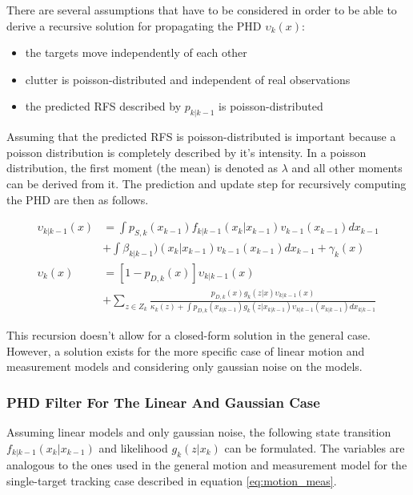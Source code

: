There are several assumptions that have to be considered in order to be able to derive a recursive solution for propagating the PHD $\upsilon_k(x)$:

\begin{itemize}
    \item the targets move independently of each other
    \item clutter is poisson-distributed and independent of real observations
    \item the predicted RFS described by $p_{k|k-1}$ is poisson-distributed
\end{itemize}

Assuming that the predicted RFS is poisson-distributed is important because a poisson distribution is completely described by it's intensity. In a poisson distribution, the first moment (the mean) is denoted as $\lambda$ and all other moments can be derived from it. The prediction and update step for recursively computing the PHD are then as follows.\cite{Vo2006PHD}

\begin{equation}
    \begin{split}
        \upsilon_{k|k-1}(x) &= \int p_{S,k}(x_{k-1})f_{k|k-1}(x_k|x_{k-1})v_{k-1}(x_{k-1})dx_{k-1} \\
        &+ \int \beta_{k|k-1})(x_k|x_{k-1})v_{k-1}(x_{k-1})dx_{k-1} + \gamma_k(x) \\
        \upsilon_{k}(x) &= [1-p_{D,k}(x)]\upsilon_{k|k-1}(x) \\
        &+ \sum\limits_{z \in Z_k} \frac{p_{D,k}(x)g_k(z|x)\upsilon_{k|k-1}(x)}{\kappa_k(z) + \int p_{D,k}(x_{k|k-1})g_k(z|x_{k|k-1})\upsilon_{k|k-1}(x_{k|k-1})dx_{k|k-1}}
    \end{split}
\end{equation}

This recursion doesn't allow for a closed-form solution in the general case. However, a solution exists for the more specific case of linear motion and measurement models and considering only gaussian noise on the models.

\subsubsection{PHD Filter For The Linear And Gaussian Case}

Assuming linear models and only gaussian noise, the following state transition $f_{k|k-1}(x_k|x_{k-1})$ and likelihood $g_k(z|x_k)$ can be formulated. The variables are analogous to the ones used in the general motion and measurement model for the single-target tracking case described in equation \eqref{eq:motion_meas}.

